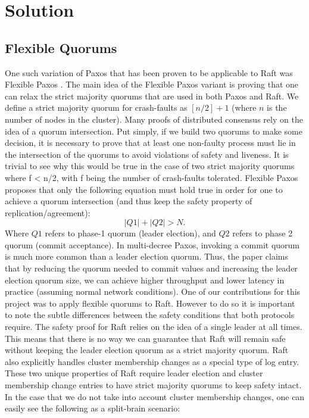 \section{Solution}
\label{sec:solution}
\subsection{Flexible Quorums}
One such variation of Paxos that has been proven to be applicable to Raft was Flexible Paxos \cite{DBLP:journals/corr/HowardMS16}. 
The main idea of the Flexible Paxos variant is proving that one can relax the strict majority quorums that are used in both Paxos and Raft. 
We define a strict majority quorum for crash-faults as $[n/2] + 1$ (where $n$ is the number of nodes in the cluster). 
Many proofs of distributed consensus rely on the idea of a quorum intersection. 
Put simply, if we build two quorums to make some decision, it is necessary to prove that at least one non-faulty process must lie in the intersection of the quorums to avoid violations of safety and liveness. 
It is trivial to see why this would be true in the case of two strict majority quorums where f < n/2, with f being the number of crash-faults tolerated.  
Flexible Paxos proposes that only the following equation must hold true in order for one to achieve a quorum intersection (and thus keep the safety property of replication/agreement):
$$|Q1| + |Q2| > N. $$
Where $Q1$ refers to phase-1 quorum (leader election), and $Q2$ refers to phase 2 quorum (commit acceptance). 
In multi-decree Paxos, invoking a commit quorum is much more common than a leader election quorum. 
Thus, the paper claims that by reducing the quorum needed to commit values and increasing the leader election quorum size, we can achieve higher throughput and lower latency in practice (assuming normal network conditions).
One of our contributions for this project was to apply flexible quorums to Raft. 
However to do so it is important to note the subtle differences between the safety conditions that both protocols require. 
The safety proof for Raft relies on the idea of a single leader at all times. 
This means that there is no way we can guarantee that Raft will remain safe without keeping the leader election quorum as a strict majority quorum. 
Raft also explicitly handles cluster membership changes as a special type of log entry. 
These two unique properties of Raft require leader election and cluster membership change entries to have strict majority quorums to keep safety intact. 
In the case that we do not take into account cluster membership changes, one can easily see the following as a split-brain scenario:

